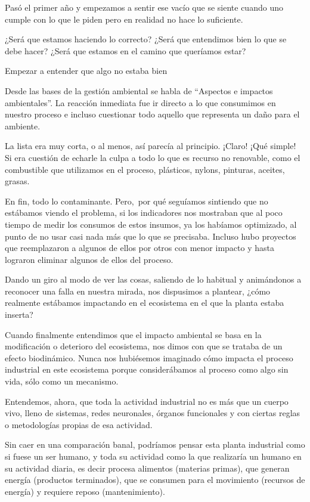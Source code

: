 \begin{fullwidth}
Pasó el primer año y empezamos a sentir ese vacío que se siente cuando
uno cumple con lo que le piden pero en realidad no hace lo suficiente.

¿Será que estamos haciendo lo correcto? ¿Será que entendimos bien lo que
se debe hacer? ¿Será que estamos en el camino que queríamos estar?

Empezar a entender que algo no estaba bien

Desde las bases de la gestión ambiental se habla de ``Aspectos e
impactos ambientales''. La reacción inmediata fue ir directo a lo que
consumimos en nuestro proceso e incluso cuestionar todo aquello que
representa un daño para el ambiente.

La lista era muy corta, o al menos, así parecía al principio. ¡Claro!
¡Qué simple! Si era cuestión de echarle la culpa a todo lo que es
recurso no renovable, como el combustible que utilizamos en el proceso,
plásticos, nylons, pinturas, aceites, grasas.

En fin, todo lo contaminante. Pero,~por qué seguíamos sintiendo que no
estábamos viendo el problema, si los indicadores nos mostraban que al
poco tiempo de medir los consumos de estos insumos, ya los habíamos
optimizado, al punto de no usar casi nada más que lo que se precisaba.
Incluso hubo proyectos que reemplazaron a algunos de ellos por otros con
menor impacto y hasta lograron eliminar algunos de ellos del proceso.

Dando un giro al modo de ver las cosas, saliendo de lo habitual y
animándonos a reconocer una falla en nuestra mirada, nos dispusimos a
plantear, ¿cómo realmente estábamos impactando en el ecosistema en el
que la planta estaba inserta?

Cuando finalmente entendimos que el impacto ambiental se basa en la
modificación o deterioro del ecosistema, nos dimos con que se trataba de
un efecto biodinámico. Nunca nos hubiésemos imaginado cómo impacta el
proceso industrial en este ecosistema porque considerábamos al proceso
como algo sin vida, sólo como un mecanismo.

Entendemos, ahora, que toda la actividad industrial no es más que un
cuerpo vivo, lleno de sistemas, redes neuronales, órganos funcionales y
con ciertas reglas o metodologías propias de esa actividad.

Sin caer en una comparación banal, podríamos pensar esta planta
industrial como si fuese un ser humano, y toda su actividad como la que
realizaría un humano en su actividad diaria, es decir procesa alimentos
(materias primas), que generan energía (productos terminados), que se
consumen para el movimiento (recursos de energía) y requiere reposo
(mantenimiento).


\end{fullwidth}
